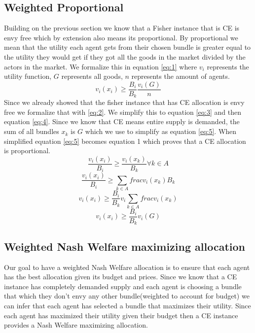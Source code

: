 \documentclass{article}
\begin{document}
\subsection{Weighted Proportional}
Building on the previous section we know that a Fisher instance that is CE is envy free which by extension also means its proportional. By proportional we mean that the utility each agent gets from their chosen bundle is greater equal to the utility they would get if they got all the goods in the market divided by the actors in the market. We formalize this in equation \ref{eq:1} where $v_i$ represents the utility function, $G$ represents all goods, $n$ represents the amount of agents. \\
\begin{equation} \label{eq:1}
    v_i(x_i) \ge \frac{B_i}{B_k}\frac{v_i(G)}{n}
\end{equation}
Since we already showed that the fisher instance that has CE allocation is envy free we  formalize that with \ref{eq:2}. We simplify this to equation \ref{eq:3} and then equation \ref{eq:4}. Since we know that CE means entire supply is demanded, the sum of all bundles $x_k$ is $G$ which we use to simplify as equation \ref{eq:5}. When simplified equation \ref{eq:5} becomes equation 1 which proves that a CE allocation is proportional. 
\begin{equation} \label{eq:2}
    \frac{v_i(x_i)}{B_i} \ge \frac{v_i(x_k)}{B_k} \forall k \in A
\end{equation}
\begin{equation}
\label{eq:3}
\frac{v_i(x_i)}{B_i}\ge \sum_{k \in A} frac{v_i(x_k)}{B_k} 
\end{equation}
\begin{equation}
\label{eq:4}
v_i(x_i) \ge \frac{B_i}{B_k} v_i\sum_{k \in A}frac{v_i(x_k)}
\end{equation}
\begin{equation}
\label{eq:5}
v_i(x_i) \ge \frac{B_i}{B_k} v_i(G)
\end{equation}
\subsection{Weighted Nash Welfare maximizing allocation}
Our goal to have a weighted Nash Welfare allocation is to ensure that each agent has the best allocation given its budget and prices. Since we know that a CE instance has completely demanded supply and each agent is choosing a bundle that which they don't envy any other bundle(weighted to account for budget) we can infer that each agent has selected a bundle that maximizes their utility. Since each agent has maximized their utility given their budget then a CE instance provides a Nash Welfare maximizing allocation.
\end{document}
